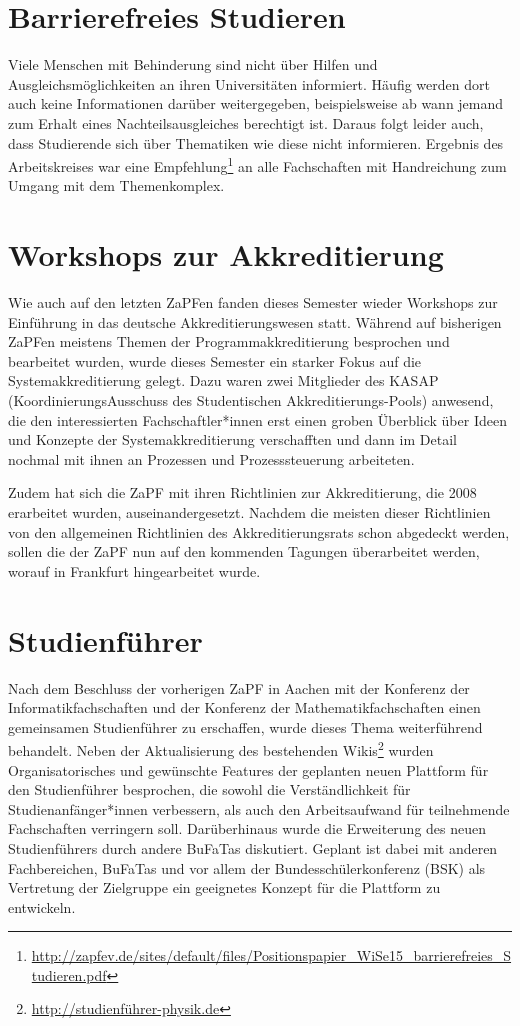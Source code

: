 \section*{Barrierefreies Studieren}
Viele Menschen mit Behinderung sind nicht über Hilfen und
Ausgleichsmöglichkeiten an ihren Universitäten informiert. Häufig werden dort
auch keine Informationen darüber weitergegeben, beispielsweise ab wann jemand
zum Erhalt eines Nachteilsausgleiches berechtigt ist. Daraus folgt leider auch,
dass Studierende sich über Thematiken wie diese nicht informieren.  Ergebnis des
Arbeitskreises war eine
Empfehlung\footnote{\href{http://zapfev.de/sites/default/files/Positionspapier\_WiSe15\_barrierefreies\_Studieren.pdf}{\url{http://zapfev.de/sites/default/files/Positionspapier\_WiSe15\_barrierefreies\_Studieren.pdf}}}
an alle Fachschaften mit Handreichung zum Umgang mit dem Themenkomplex.

\section*{Workshops zur Akkreditierung} Wie auch auf den letzten ZaPFen fanden
dieses Semester wieder Workshops zur Einführung in das deutsche
Akkreditierungswesen statt. Während auf bisherigen ZaPFen meistens Themen der
Programmakkreditierung besprochen und bearbeitet wurden, wurde dieses Semester
ein starker Fokus auf die Systemakkreditierung gelegt. Dazu waren zwei
Mitglieder des KASAP (KoordinierungsAusschuss des Studentischen
Akkreditierungs-Pools) anwesend, die den interessierten Fachschaftler*innen erst einen groben Überblick über Ideen und Konzepte der
Systemakkreditierung verschafften und dann im Detail nochmal mit ihnen an
Prozessen und Prozesssteuerung arbeiteten.

Zudem hat sich die ZaPF mit ihren Richtlinien zur Akkreditierung, die 2008
erarbeitet wurden, auseinandergesetzt. Nachdem die meisten dieser Richtlinien
von den allgemeinen Richtlinien des Akkreditierungsrats schon abgedeckt werden,
sollen die der ZaPF nun auf den kommenden Tagungen überarbeitet werden, worauf
in Frankfurt hingearbeitet wurde.

\section*{Studienführer}
Nach dem Beschluss der vorherigen ZaPF in Aachen mit der Konferenz der
Informatikfachschaften und der Konferenz der Mathematikfachschaften einen
gemeinsamen Studienführer zu  erschaffen, wurde dieses Thema weiterführend
behandelt. Neben der Aktualisierung des bestehenden
Wikis\footnote{\url{http://studienführer-physik.de}} wurden Organisatorisches
und gewünschte Features der geplanten neuen Plattform für den Studienführer
besprochen, die sowohl die Verständlichkeit für Studienanfänger*innen verbessern, als
auch den Arbeitsaufwand für teilnehmende Fachschaften verringern soll.
Darüberhinaus wurde die Erweiterung des neuen Studienführers durch andere
BuFaTas diskutiert. Geplant ist dabei  mit anderen Fachbereichen, BuFaTas und
vor allem der Bundesschülerkonferenz (BSK) als Vertretung der Zielgruppe ein
geeignetes Konzept für die Plattform zu entwickeln.

